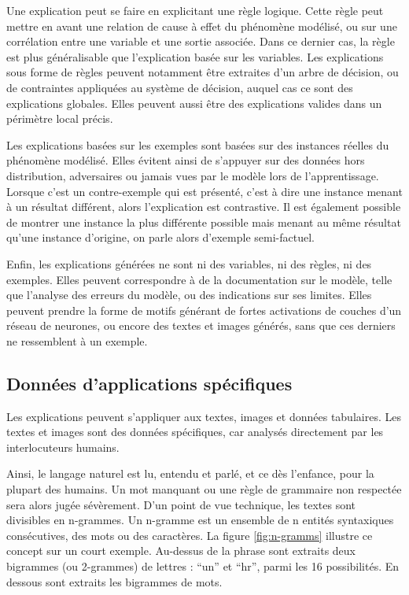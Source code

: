 Une explication peut se faire en explicitant une règle logique. Cette règle peut mettre en avant une relation de cause à effet du phénomène modélisé, ou sur une corrélation entre une variable et une sortie associée. Dans ce dernier cas, la règle est plus généralisable que l'explication basée sur les variables.
Les explications sous forme de règles peuvent notamment être extraites d'un arbre de décision, ou de contraintes appliquées au système de décision, auquel cas ce sont des explications globales. Elles peuvent aussi être des explications valides dans un périmètre local précis.

Les explications basées sur les exemples sont basées sur des instances réelles du phénomène modélisé. Elles évitent ainsi de s'appuyer sur des données hors distribution, adversaires ou jamais vues par le modèle lors de l'apprentissage. Lorsque c'est un contre-exemple qui est présenté, c'est à dire une instance menant à un résultat différent, alors l'explication est contrastive. Il est également possible de montrer une instance la plus différente possible mais menant au même résultat qu'une instance d'origine, on parle alors d'exemple semi-factuel.

Enfin, les explications générées ne sont ni des variables, ni des règles, ni des exemples. Elles peuvent correspondre à de la documentation sur le modèle, telle que l'analyse des erreurs du modèle, ou des indications sur ses limites. Elles peuvent prendre la forme de motifs générant de fortes activations de couches d'un réseau de neurones, ou encore des textes et images générés, sans que ces derniers ne ressemblent à un exemple.

\subsection{Données d'applications spécifiques}
Les explications peuvent s'appliquer aux textes, images et données tabulaires. Les textes et images sont des données spécifiques, car analysés directement par les interlocuteurs humains.

Ainsi, le langage naturel est lu, entendu et parlé, et ce dès l'enfance, pour la plupart des humains. Un mot manquant ou une règle de grammaire non respectée sera alors jugée sévèrement. D'un point de vue technique, les textes sont divisibles en n-grammes. Un n-gramme est un ensemble de n entités syntaxiques consécutives, des mots ou des caractères. La figure \ref{fig:n-gramms} illustre ce concept sur un court exemple. Au-dessus de la phrase sont extraits deux bigrammes (ou 2-grammes) de lettres : ``un'' et ``hr'', parmi les 16 possibilités. En dessous sont extraits les bigrammes de mots.

